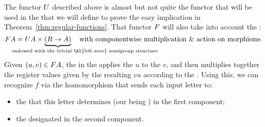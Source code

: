 The functor $\functoru$ described above is almost but not quite the functor that
will be used in the  that we will define to prove the easy
implication in Theorem~\ref{thm:regular-functions}. That functor $\functor$ will
also take into account the :
\[ \functor A =  \functoru A \times \myunderbrace{(R \to A)}{\qquad\qquad\qquad\qquad\qquad endowed with the trivial \kl{left zero} semigroup structure} \quad\text{with componentwise multiplication \& action on morphisms} \]
Given $(u,v) \in \functor A$, the  in the 
applies the  $u$ to the  $v$, and then multiplies together the register values given by the resulting  $vu$ according to the .
Using this, we can recognize $f$ via the homomorphism that sends each input letter to:
\begin{itemize}
\item the  that this letter determines (our \sst being ) in the first component;
\item the designated  in the second component.
\end{itemize}

